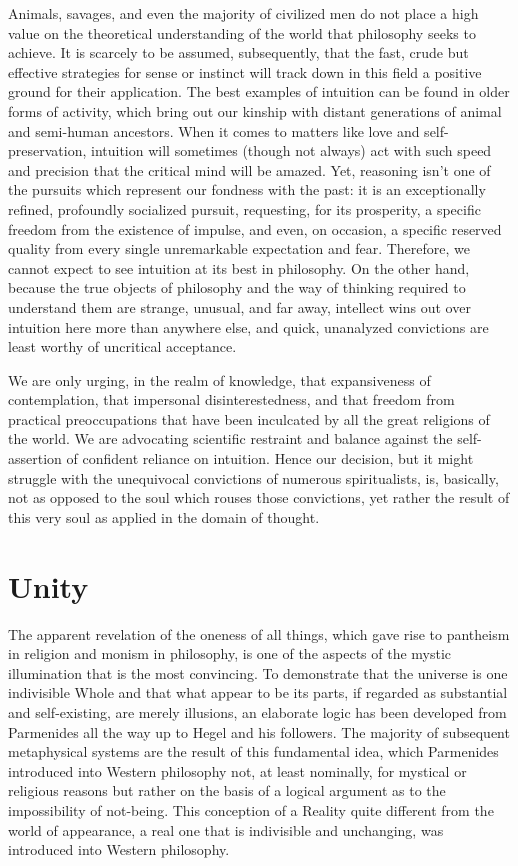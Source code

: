 \documentclass[a4paper,12pt]{book}[2004/02/16]
\theoremstyle{ilemma}
\theoremstyle{itheorem}
\theoremstyle{iother}
\theoremstyle{icorollary}
\theoremstyle{numcorollary}
\theoremstyle{idefinition}
\begin{document}
Animals, savages, and even the majority of civilized men do not place a high value on the theoretical understanding of the world that philosophy seeks to achieve. It is scarcely to be
assumed, subsequently, that the fast, crude but effective strategies for
sense or instinct will track down in this field a positive ground for
their application. The best examples of intuition can be found in older forms of activity, which bring out our kinship with distant generations of animal and semi-human ancestors. When it comes to matters like love and self-preservation, intuition will sometimes (though not always) act with such speed and precision that the critical mind will be amazed. Yet, reasoning isn't one of the pursuits which
represent our fondness with the past: it is an exceptionally refined, profoundly
socialized pursuit, requesting, for its prosperity, a specific freedom
from the existence of impulse, and even, on occasion, a specific reserved quality
from every single unremarkable expectation and fear. Therefore, we cannot expect to see intuition at its best in philosophy. On the other hand, because the true objects of philosophy and the way of thinking required to understand them are strange, unusual, and far away, intellect wins out over intuition here more than anywhere else, and quick, unanalyzed convictions are least worthy of uncritical acceptance.

We are only urging, in the realm of knowledge, that expansiveness of contemplation, that impersonal disinterestedness, and that freedom from practical preoccupations that have been inculcated by all the great religions of the world. We are advocating scientific restraint and balance against the self-assertion of confident reliance on intuition. Hence our decision, but it might struggle with the
unequivocal convictions of numerous spiritualists, is, basically, not as opposed to the soul which rouses those convictions, yet rather the result of this
very soul as applied in the domain of thought.

\section{Unity}
The apparent revelation of the oneness of all things, which gave rise to pantheism in religion and monism in philosophy, is one of the aspects of the mystic illumination that is the most convincing. To demonstrate that the universe is one indivisible Whole and that what appear to be its parts, if regarded as substantial and self-existing, are merely illusions, an elaborate logic has been developed from Parmenides all the way up to Hegel and his followers. The majority of subsequent metaphysical systems are the result of this fundamental idea, which Parmenides introduced into Western philosophy not, at least nominally, for mystical or religious reasons but rather on the basis of a logical argument as to the impossibility of not-being. This conception of a Reality quite different from the world of appearance, a real one that is indivisible and unchanging, was introduced into Western philosophy.
\end{document}
